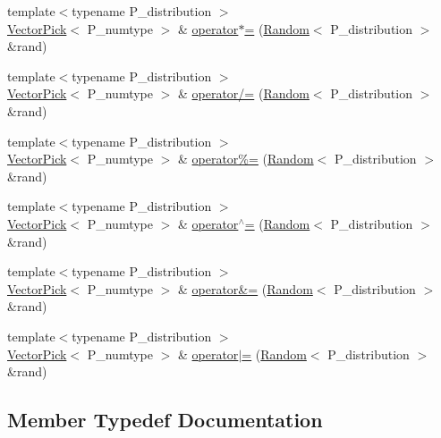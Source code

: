 \begin{DoxyCompactItemize}
\item 
{\footnotesize template$<$typename P\+\_\+distribution $>$ }\\\hyperlink{classVectorPick}{Vector\+Pick}$<$ P\+\_\+numtype $>$ \& \hyperlink{classVectorPick_a2249db85ed10774b5fd71f066a09a6b9}{operator$\ast$=} (\hyperlink{classRandom}{Random}$<$ P\+\_\+distribution $>$ \&rand)
\item 
{\footnotesize template$<$typename P\+\_\+distribution $>$ }\\\hyperlink{classVectorPick}{Vector\+Pick}$<$ P\+\_\+numtype $>$ \& \hyperlink{classVectorPick_a5fa7913c7ace01436431a559861b529c}{operator/=} (\hyperlink{classRandom}{Random}$<$ P\+\_\+distribution $>$ \&rand)
\item 
{\footnotesize template$<$typename P\+\_\+distribution $>$ }\\\hyperlink{classVectorPick}{Vector\+Pick}$<$ P\+\_\+numtype $>$ \& \hyperlink{classVectorPick_a7414594093d0933ef615edd78f211466}{operator\%=} (\hyperlink{classRandom}{Random}$<$ P\+\_\+distribution $>$ \&rand)
\item 
{\footnotesize template$<$typename P\+\_\+distribution $>$ }\\\hyperlink{classVectorPick}{Vector\+Pick}$<$ P\+\_\+numtype $>$ \& \hyperlink{classVectorPick_a8518f221cfb63c941fda4274df8ece43}{operator$^\wedge$=} (\hyperlink{classRandom}{Random}$<$ P\+\_\+distribution $>$ \&rand)
\item 
{\footnotesize template$<$typename P\+\_\+distribution $>$ }\\\hyperlink{classVectorPick}{Vector\+Pick}$<$ P\+\_\+numtype $>$ \& \hyperlink{classVectorPick_aff29b46d597b3dc334c095851724db62}{operator\&=} (\hyperlink{classRandom}{Random}$<$ P\+\_\+distribution $>$ \&rand)
\item 
{\footnotesize template$<$typename P\+\_\+distribution $>$ }\\\hyperlink{classVectorPick}{Vector\+Pick}$<$ P\+\_\+numtype $>$ \& \hyperlink{classVectorPick_a51947ef6072a04428b202f948ba40cc6}{operator$\vert$=} (\hyperlink{classRandom}{Random}$<$ P\+\_\+distribution $>$ \&rand)
\end{DoxyCompactItemize}


\subsection{Member Typedef Documentation}
\hypertarget{classVectorPick_a5c6029ef4573adb719b497be94ce2a57}{}
